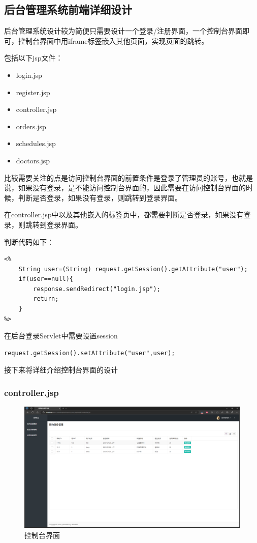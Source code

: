 \documentclass[UTF8,12pt]{article}
\begin{document}
\newpage

\subsection{后台管理系统前端详细设计}
后台管理系统设计较为简便只需要设计一个登录/注册界面，一个控制台界面即可，控制台界面中用iframe标签嵌入其他页面，实现页面的跳转。

包括以下jsp文件：

\begin{itemize}
    \item login.jsp 
    \item register.jsp
    \item controller.jsp
    \item orders.jsp
    \item schedules.jsp
    \item doctors.jsp
\end{itemize}

比较需要关注的点是访问控制台界面的前置条件是登录了管理员的账号，也就是说，如果没有登录，是不能访问控制台界面的，因此需要在访问控制台界面的时候，判断是否登录，如果没有登录，则跳转到登录界面。

在controller.jsp中以及其他嵌入的标签页中，都需要判断是否登录，如果没有登录，则跳转到登录界面。

判断代码如下：

\begin{lstlisting}[frame=shadowbox]
<%
    String user=(String) request.getSession().getAttribute("user");
    if(user==null){
        response.sendRedirect("login.jsp");
        return;
    }
%>
\end{lstlisting}

在后台登录Servlet中需要设置session

\begin{lstlisting}[frame=shadowbox]
    request.getSession().setAttribute("user",user);
\end{lstlisting}

接下来将详细介绍控制台界面的设计

\newpage

\subsubsection{controller.jsp}

\begin{figure}[htbp]
    \centering
    \includegraphics[width=1.0\textwidth]{imgs/17.png}
    \caption{控制台界面}
\end{figure}
\end{document}
